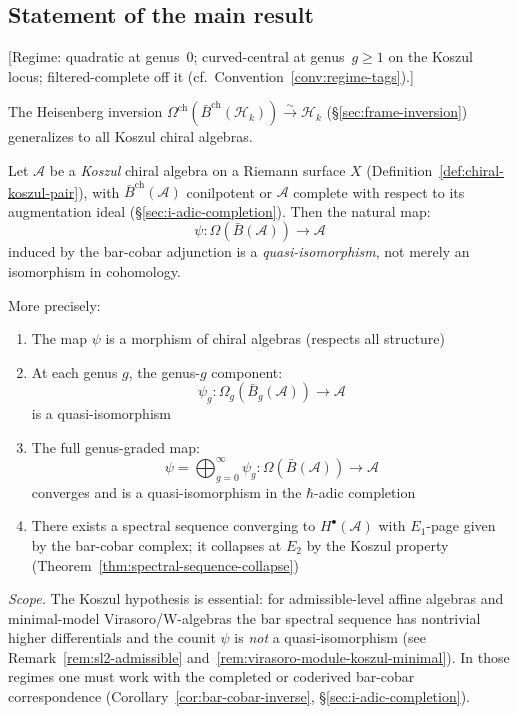 \subsection{Statement of the main result}

\begin{theorem}\label{thm:bar-cobar-inversion-qi}
\textup{[Regime: quadratic at genus~$0$; curved-central at genus~$g \geq 1$
on the Koszul locus; filtered-complete off it
\textup{(}cf.\ Convention~\textup{\ref{conv:regime-tags})}.]}

The Heisenberg inversion $\Omega^{\mathrm{ch}}(\bar{B}^{\mathrm{ch}}(\mathcal{H}_k)) \xrightarrow{\sim} \mathcal{H}_k$ (\S\ref{sec:frame-inversion}) generalizes to all Koszul chiral algebras.

Let $\mathcal{A}$ be a \emph{Koszul} chiral algebra on a Riemann surface $X$
(Definition~\ref{def:chiral-koszul-pair}), with
$\bar{B}^{\mathrm{ch}}(\mathcal{A})$ conilpotent or $\mathcal{A}$ complete
with respect to its augmentation ideal
(\S\ref{sec:i-adic-completion}).  Then the natural map:
\[\psi: \Omega(\bar{B}(\mathcal{A})) \longrightarrow \mathcal{A}\]
induced by the bar-cobar adjunction is a \emph{quasi-isomorphism}, not merely
an isomorphism in cohomology.

More precisely:
\begin{enumerate}
\item The map $\psi$ is a morphism of chiral algebras (respects all structure)

\item At each genus $g$, the genus-$g$ component:
      \[\psi_g: \Omega_g(\bar{B}_g(\mathcal{A})) \longrightarrow \mathcal{A}\]
      is a quasi-isomorphism

\item The full genus-graded map:
      \[\psi = \bigoplus_{g=0}^\infty \psi_g: \Omega(\bar{B}(\mathcal{A})) \longrightarrow \mathcal{A}\]
      converges and is a quasi-isomorphism in the $\hbar$-adic completion

\item There exists a spectral sequence converging to $H^\bullet(\mathcal{A})$
      with $E_1$-page given by the bar-cobar complex; it collapses at $E_2$
      by the Koszul property (Theorem~\ref{thm:spectral-sequence-collapse})
\end{enumerate}

\smallskip\noindent\emph{Scope.}
The Koszul hypothesis is essential: for admissible-level affine algebras
and minimal-model Virasoro/W-algebras the bar spectral sequence has
nontrivial higher differentials and the counit $\psi$ is \emph{not} a
quasi-isomorphism (see Remark~\ref{rem:sl2-admissible}
and~\ref{rem:virasoro-module-koszul-minimal}).  In those regimes one must work
with the completed or coderived bar-cobar correspondence
(Corollary~\ref{cor:bar-cobar-inverse},
\S\ref{sec:i-adic-completion}).
\end{theorem}

